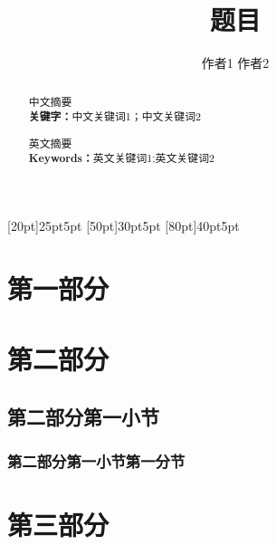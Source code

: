 \documentclass[12pt]{article}
\begin{document}
\linespread{1.5}
\pagestyle{fancy}
\fancyhead[L, R]{}
\title{\songti {} \textbf{题目}}
\author{\fangsong {}作者1 \quad 作者2}
\date{}
\maketitle
\begin{abstract}
    \fangsong 中文摘要\\
     \textbf{\heiti 关键字：}中文关键词1；中文关键词2
\end{abstract}
\begin{abstract}
     英文摘要 \\
     \textbf{\heiti Keywords：}英文关键词1;英文关键词2
\end{abstract}
\newpage
\tableofcontents
\contentsmargin{0pt}
\renewcommand\contentspage{\thecontentspage}
[20pt]{\vspace{1mm}\bfseries\songti{}}{25pt}{5pt}
[50pt]{\vspace{1mm}\songti{}}{30pt}{5pt}
[80pt]{\vspace{1mm}\songti{}}{40pt}{5pt}
\newpage
{}
\section{\songti{}第一部分}
\section{\songti{}第二部分}
\subsection{\songti{}第二部分第一小节}
\subsubsection{\songti{}第二部分第一小节第一分节}
\section{\songti{}第三部分}
\end{document}
